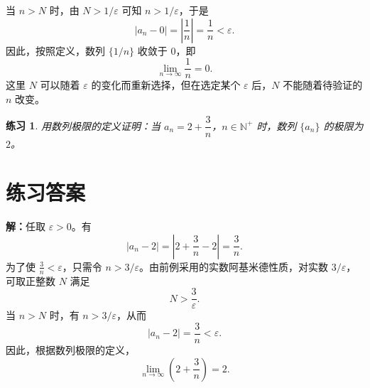 \documentclass[UTF8,fontset=fandol,11pt]{ctexart}
\newtheorem{exercise}[definition]{练习}
\begin{document}
当 $n>N$ 时，由 $N>1/\varepsilon$ 可知 $n>1/\varepsilon$，于是
\[
\left|a_n-0\right|=\left|\frac{1}{n}\right|=\frac{1}{n}<\varepsilon.
\]
因此，按照定义，数列 $\{1/n\}$ 收敛于 $0$，即
\begin{equation}
\lim_{n\to\infty}\frac{1}{n}=0.
\label{eq:reciprocal-limit}
\end{equation}
这里 $N$ 可以随着 $\varepsilon$ 的变化而重新选择，但在选定某个 $\varepsilon$ 后，$N$ 不能随着待验证的 $n$ 改变。\par
\begin{exercise}
用数列极限的定义证明：当 $a_n=2+\dfrac{3}{n}$，$n\in\mathbb{N}^+$ 时，数列 $\{a_n\}$ 的极限为 $2$。
\end{exercise}
\section*{练习答案}
\par\noindent\textbf{解：}任取 $\varepsilon>0$。有
\[
\left|a_n-2\right|=\left|2+\frac{3}{n}-2\right|=\frac{3}{n}.
\]
为了使 $\frac{3}{n}<\varepsilon$，只需令 $n>3/\varepsilon$。由前例采用的实数阿基米德性质，对实数 $3/\varepsilon$，可取正整数 $N$ 满足
\[
N>\frac{3}{\varepsilon}.
\]
当 $n>N$ 时，有 $n>3/\varepsilon$，从而
\[
\left|a_n-2\right|=\frac{3}{n}<\varepsilon.
\]
因此，根据数列极限的定义，
\[
\lim_{n\to\infty}\left(2+\frac{3}{n}\right)=2.
\]\par
\end{document}
